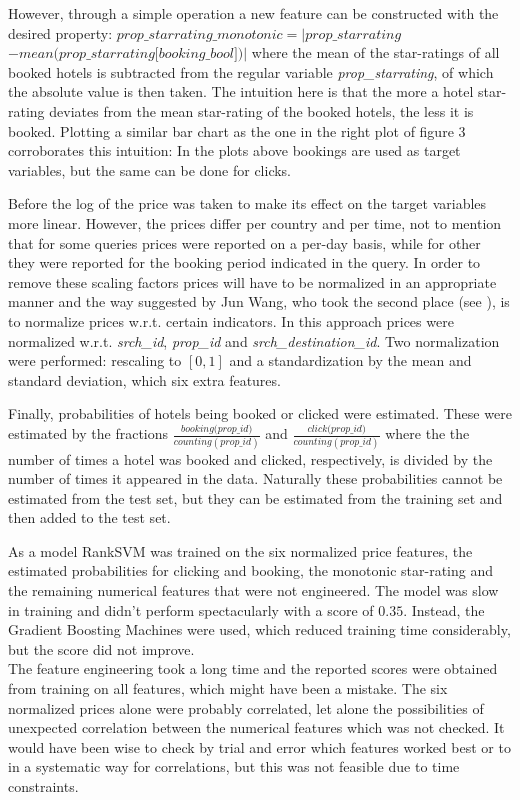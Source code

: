 \documentclass{llncs}
\begin{document}
\noindent However, through a simple operation a new feature can be constructed with the desired property: $\textit{prop\_starrating\_monotonic} = |\textit{prop\_starrating}$ \\ 
$ - \textit{mean(prop\_starrating[booking\_bool])}|$ where the mean of the star-ratings of all booked hotels is subtracted from the regular variable \textit{prop\_starrating}, of which the absolute value is then taken. The intuition here is that the more a hotel star-rating deviates from the mean star-rating of the booked hotels, the less it is booked. Plotting a similar bar chart as the one in the right plot of figure 3 corroborates this intuition:
In the plots above bookings are used as target variables, but the same can be done for clicks.

Before the log of the price was taken to make its effect on the target variables more linear. However, the prices differ per country and per time, not to mention that for some queries prices were reported on a per-day basis, while for other they were reported for the booking period indicated in the query. In order to remove these scaling factors prices will have to be normalized in an appropriate manner and the way suggested by Jun Wang, who took the second place (see \cite{Wang2013}), is to normalize prices w.r.t. certain indicators.  In this approach prices were normalized w.r.t. \textit{srch\_id}, \textit{prop\_id} and \textit{srch\_destination\_id}. Two normalization were performed: rescaling to $[0,1]$ and a standardization by the mean and standard deviation, which six extra features.

Finally, probabilities of hotels being booked or clicked were estimated. These were estimated by the fractions $\displaystyle \frac{\textit{booking(prop\_id)}}{counting(prop\_id)}$ and $\displaystyle \frac{\textit{click(prop\_id)}}{counting(prop\_id)}$ where the the number of times a hotel was booked and clicked, respectively, is divided by the number of times it appeared in the data. Naturally these probabilities cannot be estimated from the test set, but they can be estimated from the training set and then added to the test set.

As a model RankSVM was trained on the six normalized price features, the estimated probabilities for clicking and booking, the monotonic star-rating and the remaining numerical features that were not engineered. The model was slow in training and didn't perform spectacularly with a score of $0.35$. Instead, the Gradient Boosting Machines were used, which reduced training time considerably, but the score did not improve.\\
\indent The feature engineering took a long time and the reported scores were obtained from training on all features, which might have been a mistake. The six normalized prices alone were probably correlated, let alone the possibilities of unexpected correlation between the numerical features which was not checked. It would have been wise to check by trial and error which features worked best or to in a systematic way for correlations, but this was not feasible due to time constraints. 
\end{document}
